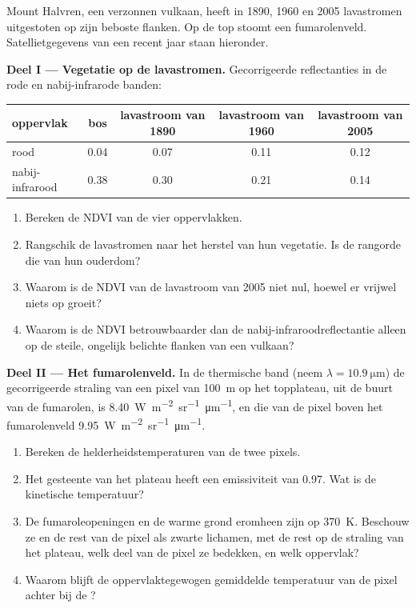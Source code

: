 \begin{problem}
\label{pb:b3:remote-sensing-gis:1}
Mount Halvren, een verzonnen vulkaan, heeft in 1890, 1960
en 2005 lavastromen uitgestoten op zijn beboste flanken. Op de top stoomt een fumarolenveld.
Satellietgegevens van een recent jaar staan hieronder.

\medskip\noindent\textbf{Deel I --- Vegetatie op de lavastromen.} Gecorrigeerde
reflectanties in de rode en nabij-infrarode banden:
\begin{center}
\small
\begin{tabular}{lcccc}
\hline
oppervlak & bos & lavastroom van 1890 & lavastroom van 1960 & lavastroom van 2005 \\
\hline
rood & 0.04 & 0.07 & 0.11 & 0.12 \\
nabij-infrarood & 0.38 & 0.30 & 0.21 & 0.14 \\
\hline
\end{tabular}
\end{center}
\begin{enumerate}
\item Bereken de NDVI van de vier oppervlakken.
\item Rangschik de lavastromen naar het herstel van hun vegetatie. Is de rangorde
  die van hun ouderdom?
\item Waarom is de NDVI van de lavastroom van 2005 niet nul, hoewel er vrijwel
  niets op groeit?
\item Waarom is de NDVI betrouwbaarder dan de nabij-infraroodreflectantie
  alleen op de steile, ongelijk belichte flanken van een vulkaan?
\end{enumerate}

\medskip\noindent\textbf{Deel II --- Het fumarolenveld.} In de thermische
band (neem $\lambda = \qty{10.9}{\micro\metre}$) de gecorrigeerde straling van
een pixel van \qty{100}{m} op het topplateau, uit de buurt van de fumarolen, is
\qty{8.40}{W.m^{-2}.sr^{-1}.\micro\metre^{-1}}, en die van de pixel boven
het fumarolenveld \qty{9.95}{W.m^{-2}.sr^{-1}.\micro\metre^{-1}}.
\begin{enumerate}[resume]
\item Bereken de helderheidstemperaturen van de twee pixels.
\item Het gesteente van het plateau heeft een emissiviteit van 0.97. Wat is de kinetische
  temperatuur?
\item De fumaroleopeningen en de warme grond eromheen zijn op
  \qty{370}{K}. Beschouw ze en de rest van de pixel als zwarte lichamen,
  met de rest op de straling van het plateau, welk deel van de pixel ze bedekken,
  en welk oppervlak?
\item Waarom blijft de oppervlaktegewogen gemiddelde temperatuur van de pixel
  achter bij de ?
\end{enumerate}


\end{problem}
